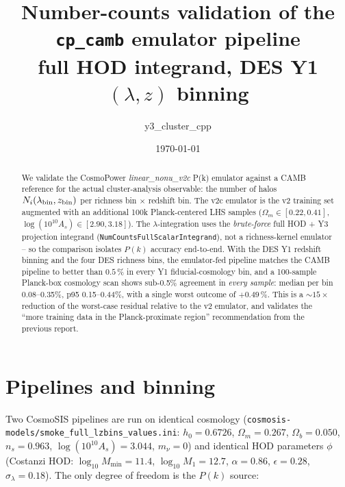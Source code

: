 \documentclass[11pt]{article}
\title{Number-counts validation of the \texttt{cp\_camb} emulator pipeline\\
  \large full HOD integrand, DES Y1 $(\lambda, z)$ binning}
\author{y3\_cluster\_cpp}
\date{\today}
\newcommand{\ncfull}{\texttt{NumCountsFullScalarIntegrand}}
\begin{document}
\maketitle

\begin{abstract}
  We validate the CosmoPower \emph{linear\_nonu\_v2c} P(k) emulator
  against a CAMB reference for the actual cluster-analysis observable:
  the number of halos $N_i(\lambda_{\rm bin}, z_{\rm bin})$ per
  richness bin $\times$ redshift bin. The v2c emulator is the v2
  training set augmented with an additional 100k Planck-centered LHS
  samples ($\Omega_m\in[0.22, 0.41]$, $\log(10^{10}A_s)\in[2.90, 3.18]$).
  The $\lambda$-integration uses the \emph{brute-force} full HOD + Y3
  projection integrand (\ncfull), not a richness-kernel emulator -- so
  the comparison isolates $P(k)$ accuracy end-to-end. With the DES Y1
  redshift binning and the four DES richness bins, the emulator-fed
  pipeline matches the CAMB pipeline to better than $0.5\,\%$ in every
  Y1 fiducial-cosmology bin, and a 100-sample Planck-box cosmology
  scan shows sub-0.5\% agreement in \emph{every sample}: median per
  bin 0.08--0.35\%, p95 0.15--0.44\%, with a single worst outcome of
  $+0.49\,\%$. This is a $\sim15\times$ reduction of the worst-case
  residual relative to the v2 emulator, and validates the ``more
  training data in the Planck-proximate region'' recommendation from
  the previous report.
\end{abstract}

\section{Pipelines and binning}

Two CosmoSIS pipelines are run on identical cosmology
(\texttt{cosmosis-models/smoke\_full\_lzbins\_values.ini}:
$h_0=0.6726$, $\Omega_m=0.267$, $\Omega_b=0.050$, $n_s=0.963$,
$\log(10^{10}A_s)=3.044$, $m_\nu = 0$) and identical HOD parameters $\phi$
(Costanzi HOD: $\log_{10} M_{\min}=11.4$, $\log_{10} M_1=12.7$,
$\alpha=0.86$, $\epsilon=0.28$, $\sigma_\lambda=0.18$). The only
degree of freedom is the $P(k)$ source:
\end{document}
